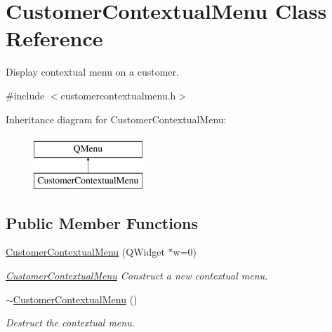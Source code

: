 \hypertarget{classCustomerContextualMenu}{\section{Customer\+Contextual\+Menu Class Reference}
\label{classCustomerContextualMenu}
}


Display contextual menu on a customer.  




{\ttfamily \#include $<$customercontextualmenu.\+h$>$}

Inheritance diagram for Customer\+Contextual\+Menu\+:\begin{figure}[H]
\begin{center}
\leavevmode
\includegraphics[height=2.000000cm]{d5/db9/classCustomerContextualMenu}
\end{center}
\end{figure}
\subsection*{Public Member Functions}
\begin{DoxyCompactItemize}
\item 
\hyperlink{classCustomerContextualMenu_a798a08f4b8526398a54752e7de87930e}{Customer\+Contextual\+Menu} (Q\+Widget $\ast$w=0)
\begin{DoxyCompactList}\small\item\em \hyperlink{classCustomerContextualMenu}{Customer\+Contextual\+Menu} Construct a new contextual menu. \end{DoxyCompactList}\item 
\hypertarget{classCustomerContextualMenu_af3e43fde4d890830bfa33b948636faae}{\hyperlink{classCustomerContextualMenu_af3e43fde4d890830bfa33b948636faae}{$\sim$\+Customer\+Contextual\+Menu} ()}\label{classCustomerContextualMenu_af3e43fde4d890830bfa33b948636faae}

\begin{DoxyCompactList}\small\item\em Destruct the contextual menu. \end{DoxyCompactList}\end{DoxyCompactItemize}


